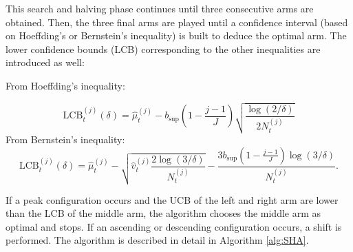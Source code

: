 \documentclass{statsmsc}
\begin{document}
This search and halving phase continues until three consecutive arms are obtained. 
Then, the three final arms are played until a confidence interval (based on Hoeffding's or Bernstein's inequality) is built to deduce the optimal arm. The lower confidence bounds (LCB) corresponding to the other inequalities are introduced as well:

From Hoeffding's inequality:

\begin{equation}
  \text{LCB}^{(j)}_t(\delta) = \hat{\mu}_t^{(j)} - b_{\sup}\left(1 - \frac{j-1}{J}\right)\sqrt{\frac{\log(2/\delta)}{2 N_t^{(j)}}}
\label{eq:LCB_hoeffding}
\end{equation}
From Bernstein's inequality:
\begin{equation}
\text{LCB}^{(j)}_t(\delta) = \hat{\mu}_t^{(j)} - \sqrt{\hat{v}_t^{(j)}\frac{2\log(3/\delta)}{N_t^{(j)}}} - \frac{3 b_{\sup}\left(1 - \frac{j-1}{J}\right) \log(3/\delta)}{N_t^{(j)}}.
\label{eq:LCB_bernstein}
\end{equation}

If a peak configuration occurs and the UCB of the left and right arm are lower than the LCB of the middle arm, the algorithm chooses the middle arm as optimal and stops. If an ascending or descending configuration occurs, a shift is performed. The algorithm is described in detail in Algorithm \ref{alg:SHA}.
\end{document}
